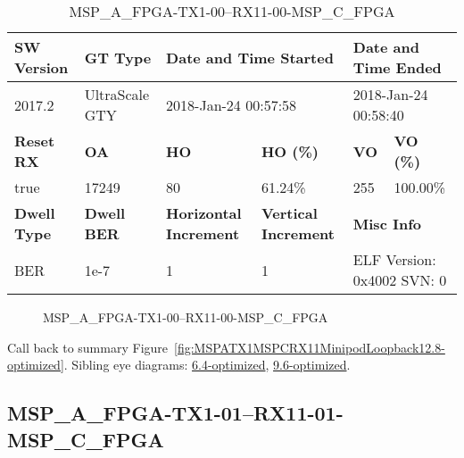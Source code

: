\begin{table}[h]
\centering
\caption{MSP\_A\_FPGA-TX1-00--RX11-00-MSP\_C\_FPGA}
\label{tab:MSPAFPGATX100RX1100MSPCFPGA12.8-optimized}
\begin{tabular}{@{}|l|l|l|l|l|l|@{}}
\toprule
\textbf{SW Version}                & \textbf{GT Type}   & \multicolumn{2}{l|}{\textbf{Date and Time Started}}            & \multicolumn{2}{l|}{\textbf{Date and Time Ended}}        \\ \midrule
2017.2                       & UltraScale GTY          & \multicolumn{2}{l|}{2018-Jan-24 00:57:58}                   & \multicolumn{2}{l|}{2018-Jan-24 00:58:40}               \\ \midrule
\textbf{Reset RX}                  & \textbf{OA} & \textbf{HO}   & \textbf{HO (\%)} & \textbf{VO} & \textbf{VO (\%)} \\ \midrule
true & 17249        & 80          & 61.24\%        & 255        & 100.00\%       \\ \midrule
\textbf{Dwell Type}                & \textbf{Dwell BER} & \textbf{Horizontal Increment} & \textbf{Vertical Increment}    & \multicolumn{2}{l|}{\textbf{Misc Info}}                  \\ \midrule
BER                            & 1e-7        & 1        & 1           & \multicolumn{2}{l|}{ELF Version: 0x4002 SVN: 0}                         \\ \bottomrule
\end{tabular}
\end{table}

\begin{figure}[h]
\caption{MSP\_A\_FPGA-TX1-00--RX11-00-MSP\_C\_FPGA} \label{fig:MSPAFPGATX100RX1100MSPCFPGA12.8-optimized}
\end{figure}

Call back to summary Figure~\ref{fig:MSPATX1MSPCRX11MinipodLoopback12.8-optimized}.
Sibling eye diagrams: \hyperref[sec:MSPAFPGATX100RX1100MSPCFPGA6.4-optimized]{6.4-optimized}, \hyperref[sec:MSPAFPGATX100RX1100MSPCFPGA9.6-optimized]{9.6-optimized}.

\clearpage
\newpage


\subsection{MSP\_A\_FPGA-TX1-01--RX11-01-MSP\_C\_FPGA}\label{sec:MSPAFPGATX101RX1101MSPCFPGA12.8-optimized}

